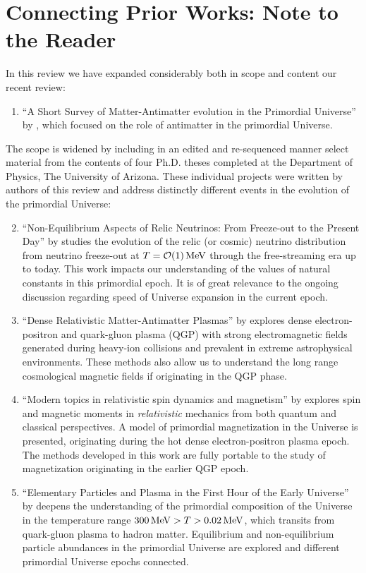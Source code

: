 \section{Connecting Prior Works: Note to the Reader}\label{list:Works}
In this review we have expanded considerably both in scope and content our recent review:
\begin{enumerate}
\item ``A Short Survey of Matter-Antimatter evolution in the Primordial Universe'' by , which focused on the role of antimatter in the primordial Universe. 
\end{enumerate}
The scope is widened by including in an edited and re-sequenced manner select material from the contents of four Ph.D. theses completed at the Department of Physics, The University of Arizona. {\color{black} These individual projects were written by authors of this review and address distinctly different events in the evolution of the primordial Universe:}
\begin{enumerate}
\setcounter{enumi}{1}
\item ``Non-Equilibrium Aspects of Relic Neutrinos: From Freeze-out to the Present Day'' by  studies the evolution of the relic (or cosmic) neutrino distribution from neutrino freeze-out at $T=\mathcal{O}(1)\text{\,MeV}$ through the free-streaming era up to today. {\color{black} This work impacts our understanding of the values of natural constants in this primordial epoch. It is of great relevance to the ongoing discussion regarding speed of Universe expansion in the current epoch.}
%
\item ``Dense Relativistic Matter-Antimatter Plasmas'' by  explores dense electron-positron and quark-gluon plasma (QGP) with strong electromagnetic fields generated during heavy-ion collisions and prevalent in extreme astrophysical environments. {\color{black} These methods also allow us to understand the long range cosmological magnetic fields if originating in the QGP phase.}
%
\item ``Modern topics in relativistic spin dynamics and magnetism'' by  explores spin and magnetic moments in \emph{relativistic} mechanics from both
quantum and classical perspectives. A model of primordial magnetization in the Universe is presented, originating during the hot dense electron-positron plasma epoch. {\color{black} The methods developed in this work are fully portable to the study of magnetization originating in the earlier QGP epoch.}
%
\item ``Elementary Particles and Plasma in the First Hour of the Early Universe'' by  deepens the understanding of the primordial composition of the Universe in the temperature range $300 \text{\,MeV}>T>0.02\text{\,MeV}$, which transits from quark-gluon plasma to hadron matter. {\color{black} Equilibrium and non-equilibrium particle abundances in the primordial Universe are explored and different primordial Universe epochs connected.}
\end{enumerate}

